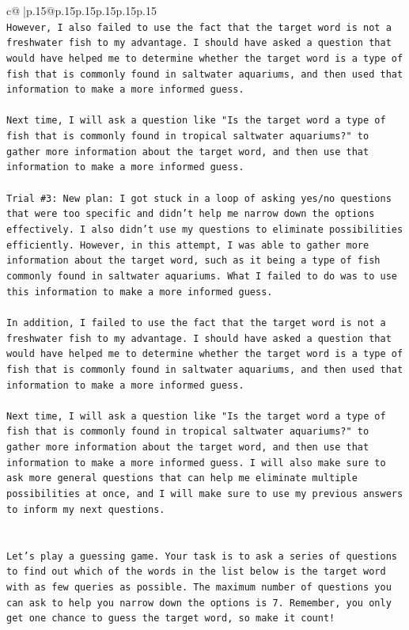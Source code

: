 \documentclass{article}
\begin{document}
{\begin{supertabular}{c@{$\;$}|p{.15\linewidth}@{}p{.15\linewidth}p{.15\linewidth}p{.15\linewidth}p{.15\linewidth}p{.15\linewidth}}
{{{\\ 
\texttt{However, I also failed to use the fact that the target word is not a freshwater fish to my advantage. I should have asked a question that would have helped me to determine whether the target word is a type of fish that is commonly found in saltwater aquariums, and then used that information to make a more informed guess. } \\
\\ 
\texttt{Next time, I will ask a question like "Is the target word a type of fish that is commonly found in tropical saltwater aquariums?" to gather more information about the target word, and then use that information to make a more informed guess.} \\
\\ 
\texttt{Trial \#3: New plan: I got stuck in a loop of asking yes/no questions that were too specific and didn't help me narrow down the options effectively. I also didn't use my questions to eliminate possibilities efficiently. However, in this attempt, I was able to gather more information about the target word, such as it being a type of fish commonly found in saltwater aquariums. What I failed to do was to use this information to make a more informed guess. } \\
\\ 
\texttt{In addition, I failed to use the fact that the target word is not a freshwater fish to my advantage. I should have asked a question that would have helped me to determine whether the target word is a type of fish that is commonly found in saltwater aquariums, and then used that information to make a more informed guess. } \\
\\ 
\texttt{Next time, I will ask a question like "Is the target word a type of fish that is commonly found in tropical saltwater aquariums?" to gather more information about the target word, and then use that information to make a more informed guess. I will also make sure to ask more general questions that can help me eliminate multiple possibilities at once, and I will make sure to use my previous answers to inform my next questions.} \\
\\ 
\\ 
\texttt{Let's play a guessing game. Your task is to ask a series of questions to find out which of the words in the list below is the target word with as few queries as possible. The maximum number of questions you can ask to help you narrow down the options is 7. Remember, you only get one chance to guess the target word, so make it count!} \\
}}}
\end{supertabular}}
\end{document}
